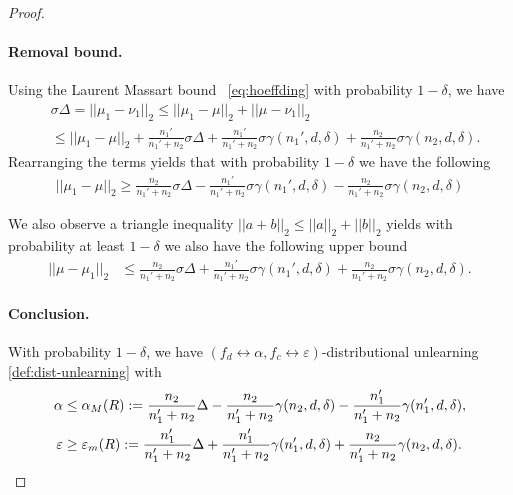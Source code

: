 \begin{proof}
\paragraph{Removal bound.}
Using the Laurent Massart bound ~\eqref{eq:hoeffding} with probability $1-\delta$, we have
\begin{align*}
   &
   \sigma \Delta= ||\mu_1 - \nu_1||_2 
     \leq  ||\mu_1 - \mu||_2 + ||\mu - \nu_1||_2
     \\
     &
    \leq  ||\mu_1 - \mu||_2  +  \frac{n_1'}{n_1' + n_2} \sigma \Delta + \frac{n_1'}{n_1' + n_2} \sigma \gamma(n_1',d,\delta) + \frac{n_2}{n_1' + n_2} \sigma \gamma(n_2, d,\delta).
\end{align*}
Rearranging the terms yields that with probability $1-\delta$ we have the following 
\begin{align*} 
    ||\mu_1 - \mu||_2  \geq 
    \frac{n_2}{n_1' + n_2} \sigma \Delta 
    - \frac{n_1'}{n_1' + n_2} \sigma \gamma(n_1',d,\delta) - \frac{n_2}{n_1' + n_2} \sigma \gamma(n_2, d,\delta)
\end{align*}
\begin{remark}  \label{rem:upperboundRR}
    We also observe a triangle inequality $||a+b||_2 \leq ||a||_2 +||b||_2$ yields with probability at least $1-\delta$ we also have the following upper bound
    \begin{align*}
    ||\mu - \mu_1||_2
    &
    \leq
    \frac{n_2}{n_1' + n_2} \sigma \Delta 
    +
    \frac{n_1'}{n_1' + n_2} \sigma \gamma(n_1',d,\delta) 
    +
    \frac{n_2}{n_1' + n_2} \sigma \gamma(n_2, d,\delta).
\end{align*}
\end{remark}


\paragraph{Conclusion.}
With probability $1-\delta$, we have $(f_d \leftrightarrow \alpha, f_c \leftrightarrow  \varepsilon)$-distributional unlearning \ref{def:dist-unlearning} with
\begin{align*}
    \alpha 
    &
    \leq
    \alpha_M(R)
    :=
    \frac{n_2}{n_1' + n_2} \Delta 
    -
    \frac{n_2}{n_1' + n_2} \gamma(n_2, d,\delta)
    - 
    \frac{n_1'}{n_1' + n_2} \gamma(n_1',d,\delta) 
    ,\\
    \varepsilon &\geq 
    \varepsilon_m(R)
    :=
    \frac{n_1'}{n_1' + n_2}  \Delta + \frac{n_1'}{n_1' + n_2}  \gamma(n_1',d,\delta) + \frac{n_2}{n_1' + n_2}  \gamma(n_2, d,\delta).
\end{align*}
\end{proof}

